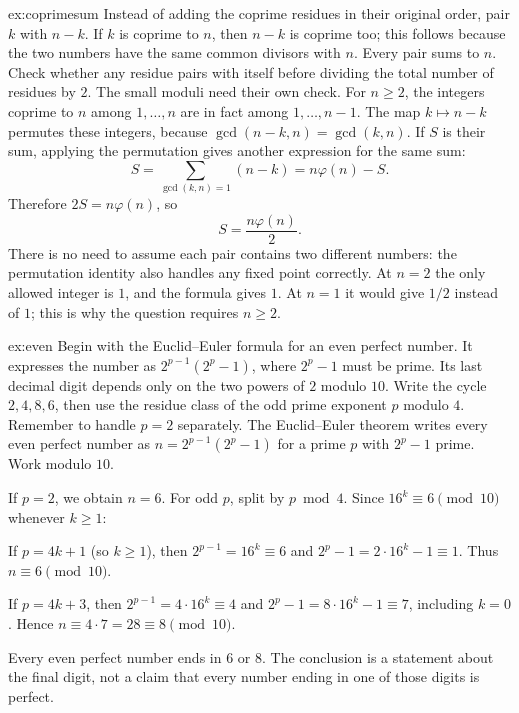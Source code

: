 \begin{solution}{ex:coprimesum}
\idea Instead of adding the coprime residues in their original order, pair $k$ with $n-k$. If $k$ is coprime to $n$, then $n-k$ is coprime too; this follows because the two numbers have the same common divisors with $n$. Every pair sums to $n$. Check whether any residue pairs with itself before dividing the total number of residues by $2$. The small moduli need their own check.
\writeup For $n\ge2$, the integers coprime to $n$ among $1,\ldots,n$ are in fact among $1,\ldots,n-1$. The map $k\mapsto n-k$ permutes these integers, because $\gcd(n-k,n)=\gcd(k,n)$. If $S$ is their sum, applying the permutation gives another expression for the same sum:
\[
S=\sum_{\gcd(k,n)=1}(n-k)
=n\varphi(n)-S.
\]
Therefore $2S=n\varphi(n)$, so
\[
S=\frac{n\varphi(n)}2.
\]
There is no need to assume each pair contains two different numbers: the permutation identity also handles any fixed point correctly.
At $n=2$ the only allowed integer is $1$, and the formula gives $1$.
At $n=1$ it would give $1/2$ instead of $1$; this is why the question
requires $n\ge2$.
\end{solution}

\begin{solution}{ex:even}
\idea Begin with the Euclid--Euler formula for an even perfect number. It expresses the number as $2^{p-1}(2^p-1)$, where $2^p-1$ must be prime. Its last decimal digit depends only on the two powers of $2$ modulo $10$. Write the cycle $2,4,8,6$, then use the residue class of the odd prime exponent $p$ modulo $4$. Remember to handle $p=2$ separately.
\writeup The Euclid--Euler theorem writes every even perfect number as $n=2^{p-1}(2^p-1)$ for a prime $p$ with $2^p-1$ prime. Work modulo $10$.

If $p=2$, we obtain $n=6$. For odd $p$, split by $p\bmod4$. Since $16^k\equiv6\pmod{10}$ whenever $k\ge1$:

If $p=4k+1$ (so $k\ge1$), then $2^{p-1}=16^k\equiv6$ and
$2^p-1=2\cdot16^k-1\equiv1$. Thus $n\equiv6\pmod{10}$.

If $p=4k+3$, then $2^{p-1}=4\cdot16^k\equiv4$ and $2^p-1=8\cdot16^k-1\equiv7$, including $k=0$. Hence $n\equiv4\cdot7=28\equiv8\pmod{10}$.

Every even perfect number ends in $6$ or $8$. The conclusion is a statement about the final digit, not a claim that every number ending in one of those digits is perfect.
\end{solution}

